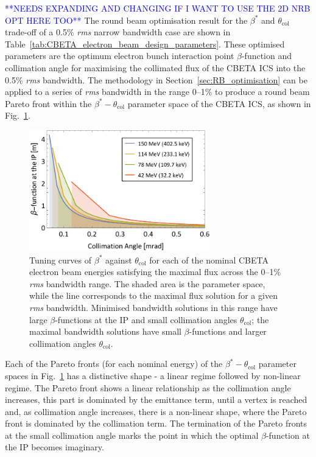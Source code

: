 \documentclass[../main.tex]{subfiles}
\begin{document}
\textcolor{blue}{**NEEDS EXPANDING AND CHANGING IF I WANT TO USE THE 2D NRB OPT HERE TOO**}
The round beam optimisation result for the $\beta^{*}$ and $\theta_{\mathrm{col}}$ trade-off of a 0.5\% \textit{rms} narrow bandwidth case are shown in Table~\ref{tab:CBETA_electron_beam_design_parameters}. These optimised parameters are the optimum electron bunch interaction point $\beta$-function and collimation angle for maximising the collimated flux of the CBETA ICS into the 0.5\% \textit{rms} bandwidth. The methodology in Section~\ref{sec:RB_optimisation} can be applied to a series of \textit{rms} bandwidth in the range 0--1\% to produce a round beam Pareto front within the $\beta^{*}-\theta_{\mathrm{col}}$ parameter space of the CBETA ICS, as shown in Fig.~\ref{fig:CBETA_beta_theta_parameter_space}.
\begin{figure}[!h]
\centering
\includegraphics[width=0.7\textwidth]{Figures/CBETA_Inverse_Compton_Source_Design/CBETABetaTheta.pdf}
\caption{Tuning curves of $\beta^{*}$ against $\theta_{\mathrm{col}}$ for each of the nominal CBETA electron beam energies satisfying the maximal flux across the 0--1\% \textit{rms} bandwidth range. The shaded area is the parameter space, while the line corresponds to the maximal flux solution for a given \textit{rms} bandwidth. Minimised bandwidth solutions in this range have large $\beta$-functions at the IP and small collimation angles $\theta_{\mathrm{col}}$; the maximal bandwidth solutions have small $\beta$-functions and larger collimation angles $\theta_{\mathrm{col}}$.}
\label{fig:CBETA_beta_theta_parameter_space}
\end{figure}

Each of the Pareto fronts (for each nominal energy) of the $\beta^{*}-\theta_{\mathrm{col}}$ parameter spaces in Fig.~\ref{fig:CBETA_beta_theta_parameter_space} has a distinctive shape - a linear regime followed by non-linear regime. The Pareto front shows a linear relationship as the collimation angle increases, this part is dominated by the emittance term, until a vertex is reached and, as collimation angle increases, there is a non-linear shape, where the Pareto front is dominated by the collimation term. The termination of the Pareto fronts at the small collimation angle marks the point in which the optimal $\beta$-function at the IP becomes imaginary.
\end{document}
